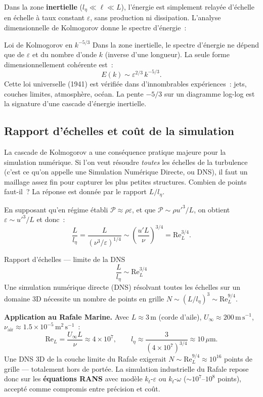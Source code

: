\documentclass[11pt,a4paper]{report}
\begin{document}
Dans la zone \textbf{inertielle} ($l_\eta \ll \ell \ll L$), l'\'energie est simplement
relay\'ee d'\'echelle en \'echelle \`a taux constant $\varepsilon$, sans production ni dissipation.
L'analyse dimensionnelle de Kolmogorov donne le spectre d'\'energie~:

\begin{importantbox}{Loi de Kolmogorov en $k^{-5/3}$}
Dans la zone inertielle, le spectre d'\'energie ne d\'epend que de $\varepsilon$ et du nombre
d'onde $k$ (inverse d'une longueur). La seule forme dimensionnellement coh\'erente est~:
\[
  E(k) \sim \varepsilon^{2/3}\,k^{-5/3}.
\]
Cette loi universelle (1941) est v\'erifi\'ee dans d'innombrables exp\'eriences~: jets,
couches limites, atmosph\`ere, oc\'ean. La pente $-5/3$ sur un diagramme log-log est la
signature d'une cascade d'\'energie inertielle.
\end{importantbox}

\subsection{Rapport d'\'echelles et co\^ut de la simulation}

La cascade de Kolmogorov a une cons\'equence pratique majeure pour la simulation num\'erique.
Si l'on veut r\'esoudre \emph{toutes} les \'echelles de la turbulence (c'est ce qu'on appelle
une Simulation Num\'erique Directe, ou DNS), il faut un maillage assez fin pour capturer les
plus petites structures. Combien de points faut-il~? La r\'eponse est donn\'ee par le rapport
$L/l_\eta$.

En supposant qu'en r\'egime \'etabli $\mathcal{P} \approx \rho\varepsilon$, et que
$\mathcal{P} \sim \rho u'^3/L$, on obtient $\varepsilon \sim u'^3/L$ et donc~:
\[
  \frac{L}{l_\eta} = \frac{L}{(\nu^3/\varepsilon)^{1/4}}
  \sim \left(\frac{u'L}{\nu}\right)^{3/4} = \mathrm{Re}_L^{3/4}.
\]

\begin{importantbox}{Rapport d'\'echelles --- limite de la DNS}
\[
  \frac{L}{l_\eta} \sim \mathrm{Re}_L^{3/4}
\]
Une simulation num\'erique directe (DNS) r\'esolvant toutes les \'echelles sur un domaine 3D
n\'ecessite un nombre de points en grille $N \sim (L/l_\eta)^3 \sim \mathrm{Re}_L^{9/4}$.
\end{importantbox}

\medskip
\noindent\textbf{Application au Rafale Marine.}
Avec $L \approx 3\,\mathrm{m}$ (corde d'aile), $U_\infty \approx 200\,\mathrm{m\,s^{-1}}$,
$\nu_\mathrm{air} \approx 1.5\times10^{-5}\,\mathrm{m^2\,s^{-1}}$~:
\[
  \mathrm{Re}_L = \frac{U_\infty L}{\nu} \approx 4\times10^7,
  \qquad l_\eta \approx \frac{3}{(4\times10^7)^{3/4}} \approx 10\,\mu\mathrm{m}.
\]
Une DNS 3D de la couche limite du Rafale exigerait
$N \sim \mathrm{Re}_L^{9/4} \approx 10^{16}$ points de grille --- totalement hors de port\'ee.
La simulation industrielle du Rafale repose donc sur les \textbf{\'equations RANS} avec mod\`ele
$k_t$-$\varepsilon$ ou $k_t$-$\omega$ ($\sim 10^7$--$10^8$ points), accept\'e comme
compromis entre pr\'ecision et co\^ut.
\end{document}
